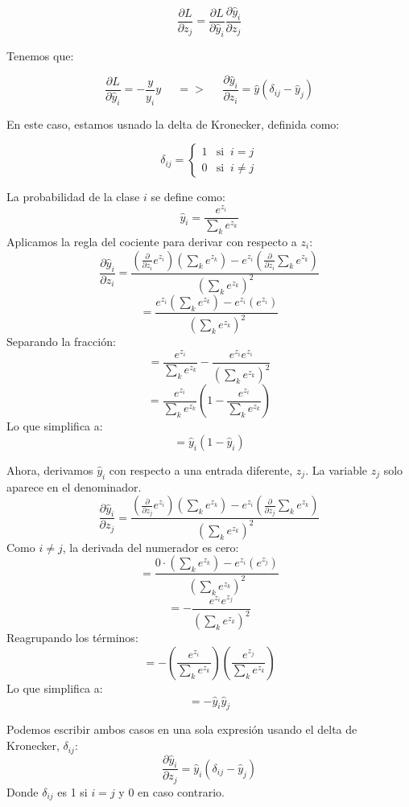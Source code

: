 \[
    \frac{\partial L}{\partial z_j} = \frac{\partial L}{\partial \hat{y}_i} \frac{\partial \hat{y}_i}{\partial z_j}
\]

Tenemos que:

\[
    \frac{\partial L}{\partial \hat{y}_i} = -\frac{y}{y_i} y \;\;\;\;\; => \;\;\;\;\; \frac{\partial \hat{y}_i}{\partial z_i} = \hat{y} (\delta_{ij} - \hat{y}_j)
\]

En este caso, estamos usnado la delta de Kronecker, definida como:

\[
    \delta_{ij} = \begin{cases}
         1 & \text{si} \;\; i=j\\
         0 & \text{si} \;\; i \neq j
    \end{cases}
\]


La probabilidad de la clase $i$ se define como:
\[
\hat{y}_i = \frac{e^{z_i}}{\sum_k e^{z_k}}
\]
Aplicamos la regla del cociente para derivar con respecto a $z_i$:
\[
\frac{\partial \hat{y}_i}{\partial z_i} = \frac{ \left(\frac{\partial}{\partial z_i}e^{z_i}\right) \left(\sum_k e^{z_k}\right) - e^{z_i} \left(\frac{\partial}{\partial z_i}\sum_k e^{z_k}\right) }{\left(\sum_k e^{z_k}\right)^2}
\]
\[
= \frac{ e^{z_i} \left(\sum_k e^{z_k}\right) - e^{z_i} (e^{z_i}) }{\left(\sum_k e^{z_k}\right)^2}
\]
Separando la fracción:
\[
= \frac{e^{z_i}}{\sum_k e^{z_k}} - \frac{e^{z_i}e^{z_i}}{\left(\sum_k e^{z_k}\right)^2}
\]
\[
= \frac{e^{z_i}}{\sum_k e^{z_k}} \left(1 - \frac{e^{z_i}}{\sum_k e^{z_k}}\right)
\]
Lo que simplifica a:
\[
= \hat{y}_i(1 - \hat{y}_i)
\]

Ahora, derivamos $\hat{y}_i$ con respecto a una entrada diferente, $z_j$. La variable $z_j$ solo aparece en el denominador.
\[
\frac{\partial \hat{y}_i}{\partial z_j} = \frac{ \left(\frac{\partial}{\partial z_j}e^{z_i}\right) \left(\sum_k e^{z_k}\right) - e^{z_i} \left(\frac{\partial}{\partial z_j}\sum_k e^{z_k}\right) }{\left(\sum_k e^{z_k}\right)^2}
\]
Como $i \neq j$, la derivada del numerador es cero:
\[
= \frac{ 0 \cdot \left(\sum_k e^{z_k}\right) - e^{z_i} (e^{z_j}) }{\left(\sum_k e^{z_k}\right)^2}
\]
\[
= - \frac{e^{z_i} e^{z_j}}{\left(\sum_k e^{z_k}\right)^2}
\]
Reagrupando los términos:
\[
= - \left(\frac{e^{z_i}}{\sum_k e^{z_k}}\right) \left(\frac{e^{z_j}}{\sum_k e^{z_k}}\right)
\]
Lo que simplifica a:
\[
= -\hat{y}_i \hat{y}_j
\]

Podemos escribir ambos casos en una sola expresión usando el delta de Kronecker, $\delta_{ij}$:
\[
\frac{\partial \hat{y}_i}{\partial z_j} = \hat{y}_i(\delta_{ij} - \hat{y}_j)
\]
Donde $\delta_{ij}$ es 1 si $i=j$ y 0 en caso contrario.

